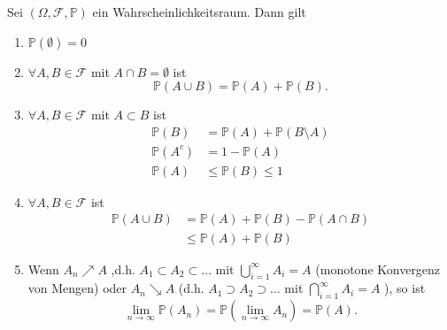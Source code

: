 \begin{lemma}\label{lm:weitere-eigenschaften-eines-wahrscheinlichkeitsraums}
    Sei $(\Omega, \mathcal{F}, \mathbb{P})$ ein Wahrscheinlichkeitsraum. Dann gilt
\begin{enumerate}[label=\protect\circled{\alph*}]
    \item $\mathbb{P}(\emptyset)=0$ 
    \item $\forall A,B\in \mathcal{F}$ mit $A\cap B = \emptyset$ ist
        \[
            \mathbb{P}(A\cup B ) = \mathbb{P}(A) + \mathbb{P}(B)
        .\] 
    \item      $\forall A,B\in \mathcal{F}$ mit $A\subset B$ ist 
        \begin{equation*}
            \begin{split}
                \mathbb{P}(B) &= \mathbb{P}(A) + \mathbb{P}(B \setminus A)  \\
                \mathbb{P}(A^{c}) &= 1 - \mathbb{P}(A) \\
                \mathbb{P}(A) &\leq  \mathbb{P}(B) \leq  1
            \end{split}
        \end{equation*}
    \item $\forall A,B \in \mathcal{F}$ ist
        \begin{equation*}
            \begin{split}
                \mathbb{P}(A \cup B) &= \mathbb{P}(A) + \mathbb{P}(B) - \mathbb{P}(A\cap B) \\
                                     &\leq  \mathbb{P}(A) + \mathbb{P}(B)
            \end{split}
        \end{equation*}
    \item Wenn $A_n \nearrow A$ ,d.h. $A_1\subset A_2\subset \ldots$ mit $\bigcup_{i =1}^{\infty} A_i = A$ (monotone Konvergenz von Mengen) oder $A_n \searrow A$ (d.h.  $A_1\supset A_2 \supset \ldots$ mit $\bigcap_{i=1}^{\infty} A_i = A $ ), so ist
        \[
            \lim_{n \to \infty} \mathbb{P}(A_n) = \mathbb{P}\left( \lim_{n \to \infty} A_n \right)  = \mathbb{P}(A)
        .\] 
\end{enumerate}
\end{lemma}
